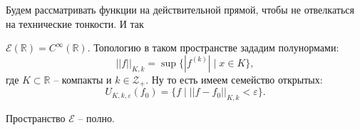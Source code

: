 Будем рассматривать функции на действительной прямой, чтобы не отвелкаться на технические тонкости. И так
\begin{to_def}
	$\mathcal{E}(\mathbb{R}) = C^{\infty}(\mathbb{R})$. Топологию в таком пространстве зададим полунормами:
	\begin{equation*}
		||f||_{K,k} = \sup \{ |f^{(k)}| \mid x \in K\},
	\end{equation*}
	где $K \subset \mathbb{R}$ -- компакты и $k \in \mathcal{Z}_+$. Ну то есть имеем семейство открытых:
	\begin{equation*}
		U_{K,k,\varepsilon} (f_0) = \{f \mid ||f - f_0||_{K,k} < \varepsilon\}.
	\end{equation*}
\end{to_def}

\begin{to_thr}
	Пространство $\mathcal{E}$ -- полно.
\end{to_thr}

